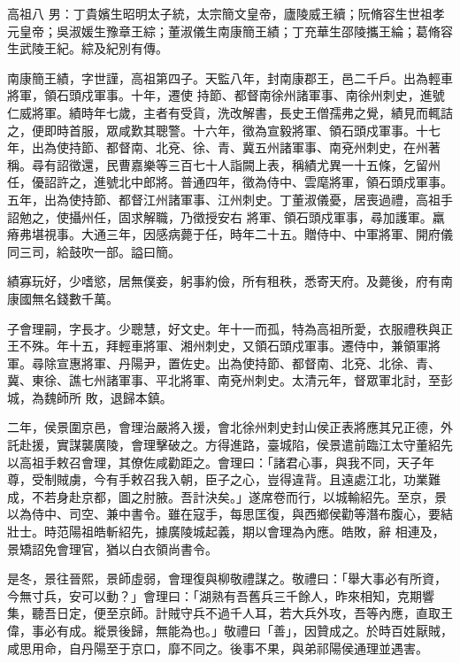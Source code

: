 
\begin{pinyinscope}

 高祖八
 男：丁貴嬪生昭明太子統，太宗簡文皇帝，廬陵威王續；阮脩容生世祖孝元皇帝；吳淑媛生豫章王綜；董淑儀生南康簡王績；丁充華生邵陵攜王綸；葛脩容生武陵王紀。綜及紀別有傳。



 南康簡王績，字世謹，高祖第四子。天監八年，封南康郡王，邑二千戶。出為輕車將軍，領石頭戍軍事。十年，遷使
 持節、都督南徐州諸軍事、南徐州刺史，進號仁威將軍。績時年七歲，主者有受貨，洗改解書，長史王僧孺弗之覺，績見而輒詰之，便即時首服，眾咸歎其聰警。十六年，徵為宣毅將軍、領石頭戍軍事。十七年，出為使持節、都督南、北兗、徐、青、冀五州諸軍事、南兗州刺史，在州著稱。尋有詔徵還，民曹嘉樂等三百七十人詣闕上表，稱績尤異一十五條，乞留州任，優詔許之，進號北中郎將。普通四年，徵為侍中、雲麾將軍，領石頭戍軍事。五年，出為使持節、都督江州諸軍事、江州刺史。丁董淑儀憂，居喪過禮，高祖手詔勉之，使攝州任，固求解職，乃徵授安右
 將軍、領石頭戍軍事，尋加護軍。羸瘠弗堪視事。大通三年，因感病薨于任，時年二十五。贈侍中、中軍將軍、開府儀同三司，給鼓吹一部。謚曰簡。



 績寡玩好，少嗜慾，居無僕妾，躬事約儉，所有租秩，悉寄天府。及薨後，府有南康國無名錢數千萬。



 子會理嗣，字長才。少聰慧，好文史。年十一而孤，特為高祖所愛，衣服禮秩與正王不殊。年十五，拜輕車將軍、湘州刺史，又領石頭戍軍事。遷侍中，兼領軍將軍。尋除宣惠將軍、丹陽尹，置佐史。出為使持節、都督南、北兗、北徐、青、冀、東徐、譙七州諸軍事、平北將軍、南兗州刺史。太清元年，督眾軍北討，至彭城，為魏師所
 敗，退歸本鎮。



 二年，侯景圍京邑，會理治嚴將入援，會北徐州刺史封山侯正表將應其兄正德，外託赴援，實謀襲廣陵，會理擊破之。方得進路，臺城陷，侯景遣前臨江太守董紹先以高祖手敕召會理，其僚佐咸勸距之。會理曰：「諸君心事，與我不同，天子年尊，受制賊虜，今有手敕召我入朝，臣子之心，豈得違背。且遠處江北，功業難成，不若身赴京都，圖之肘腋。吾計決矣。」遂席卷而行，以城輸紹先。至京，景以為侍中、司空、兼中書令。雖在寇手，每思匡復，與西鄉侯勸等潛布腹心，要結壯士。時范陽祖皓斬紹先，據廣陵城起義，期以會理為內應。皓敗，辭
 相連及，景矯詔免會理官，猶以白衣領尚書令。



 是冬，景往晉熙，景師虛弱，會理復與柳敬禮謀之。敬禮曰：「舉大事必有所資，今無寸兵，安可以動？」會理曰：「湖熟有吾舊兵三千餘人，昨來相知，克期響集，聽吾日定，便至京師。計賊守兵不過千人耳，若大兵外攻，吾等內應，直取王偉，事必有成。縱景後歸，無能為也。」敬禮曰「善」，因贊成之。於時百姓厭賊，咸思用命，自丹陽至于京口，靡不同之。後事不果，與弟祁陽侯通理並遇害。




\end{pinyinscope}
